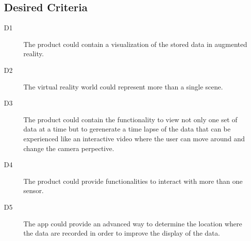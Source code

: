 \subsection{Desired Criteria}

\begin{description}
  \item[D1] The product could contain a visualization of the stored data in augmented reality.
  \item[D2] The virtual reality world could represent more than a single scene.
  \item[D3] The product could contain the functionality to view not only one set of data at a time but to gerenerate a time lapse of the data that can be experienced like an interactive video where the user can move around and change the camera perpective.
  \item[D4] The product could provide functionalities to interact with more than one sensor.
  \item[D5] The app could provide an advanced way to determine the location where the data are recorded in order to improve the display of the data.
\end{description}

